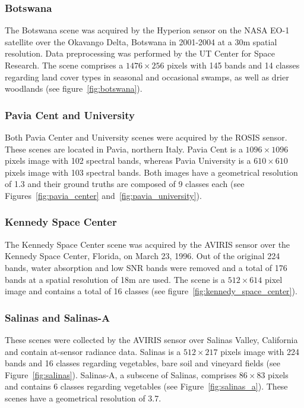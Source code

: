 \documentclass[remotesensing,article,submit,moreauthors,pdftex]{Definitions/mdpi}
\begin{document}
\begin{paracol}{2}
\linenumbers
\switchcolumn

\subsubsection*{Botswana}

The Botswana scene was acquired by the Hyperion sensor on the NASA EO-1
satellite over the Okavango Delta, Botswana in 2001-2004 at a 30m spatial
resolution. Data preprocessing was performed by the UT Center for Space
Research. The scene comprises a $1476 \times 256$ pixels with 145 bands and 14
classes regarding land cover types in seasonal and occasional swamps, as well
as drier woodlands (see figure~\ref{fig:botswana}).

\subsubsection*{Pavia Cent and University}

Both Pavia Center and University scenes were acquired by the ROSIS sensor.
These scenes are located in Pavia, northern Italy. Pavia Cent is a $1096
\times 1096$ pixels image with 102 spectral bands, whereas Pavia University is
a $610 \times 610$ pixels image with 103 spectral bands. Both images have a
geometrical resolution of 1.3 and their ground truths are
composed of 9 classes each (see Figures~\ref{fig:pavia_center}
and~\ref{fig:pavia_university}).

\subsubsection*{Kennedy Space Center}

The Kennedy Space Center scene was acquired by the AVIRIS sensor over the
Kennedy Space Center, Florida, on March 23, 1996. Out of the original 224
bands, water absorption and low SNR bands were removed and a total of 176
bands at a spatial resolution of 18m are used. The scene is a $512 \times 614$
pixel image and contains a total of 16 classes (see
figure~\ref{fig:kennedy_space_center}).

\subsubsection*{Salinas and Salinas-A}

These scenes were collected by the AVIRIS sensor over Salinas Valley,
California and contain at-sensor radiance data. Salinas is a $512 \times 217$
pixels image with 224 bands and 16 classes regarding vegetables, bare soil and
vineyard fields (see Figure~\ref{fig:salinas}). Salinas-A, a subscene of
Salinas, comprises $86 \times 83$ pixels and contains 6 classes regarding
vegetables (see Figure~\ref{fig:salinas_a}). These scenes have a geometrical
resolution of 3.7.


\end{paracol}
\end{document}
